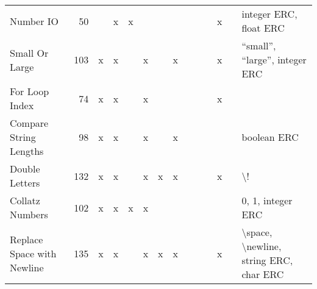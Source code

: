 \documentclass{sig-alternate}
\begin{document}
\begin{table*}
\begin{tabular}{>{\raggedright}p{3.1cm}rccccccccccc>{\raggedright}p{5.5cm}}
\midrule
Number IO                  & 50              &      & x       & x     &         &      &        &                    &                  &                   & x     &            & integer ERC, float ERC                                                                                                                                                                                                      \tabularnewline
Small Or Large             & 103             & x    & x       &       & x       &      & x      &                    &                  &                   & x     &            & ``small'', ``large'', integer ERC                                                                                                                                                                                               \tabularnewline
For Loop Index             & 74              & x    & x       &       & x       &      &        &                    &                  &                   & x     &            &                                                                                                                                                                                                                             \tabularnewline
Compare String Lengths     & 98              & x    & x       &       & x       &      & x      &                    &                  &                   &       &            & boolean ERC                                                                                                                                                                                                                 \tabularnewline
Double Letters             & 132             & x    & x       &       & x       & x    & x      &                    &                  &                   & x     &            & \textbackslash !                                                                                                                                                                                                            \tabularnewline
Collatz Numbers            & 102             & x    & x       & x     & x       &      &        &                    &                  &                   &       &            & 0, 1, integer ERC                                                                                                                                                                                                           \tabularnewline
Replace Space with Newline & 135             & x    & x       &       & x       & x    & x      &                    &                  &                   & x     &            & \textbackslash space, \textbackslash newline, string ERC, char ERC                                                                                                                                                          \tabularnewline

\end{tabular}
\end{table*}
\end{document}
